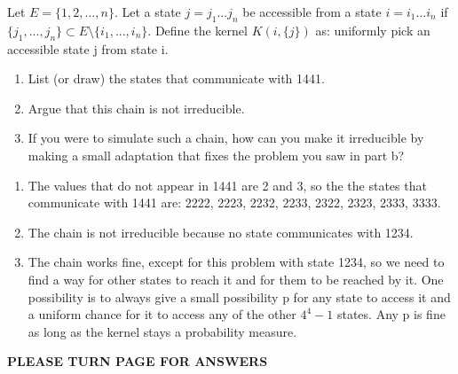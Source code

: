\begin{Exercise}
Let $E = \{1, 2, ..., n\}$. Let a state $j = j_1...j_n$ be accessible from a state $i = i_1...i_n$ if $\{j_1, ..., j_n\} \subset E \setminus \{i_1, ..., i_n\} $. Define the kernel $K(i, \{j\})$ as: uniformly pick an accessible state j from state i. 
\begin{enumerate}[label=(\alph*)]
\item List (or draw) the states that communicate with 1441.
\item Argue that this chain is not irreducible.
\item If you were to simulate such a chain, how can you make it irreducible by making a small adaptation that fixes the problem you saw in part b?
\end{enumerate}
\end{Exercise}
\begin{Answer}
\begin{enumerate}[label=(\alph*)]
\item The values that do not appear in 1441 are 2 and 3, so the the states that communicate with 1441 are: 2222, 2223, 2232, 2233, 2322, 2323, 2333, 3333.
\item The chain is not irreducible because no state communicates with 1234.
\item The chain works fine, except for this problem with state 1234, so we need to find a way for other states to reach it and for them to be reached by it. One possibility is to always give a small possibility p for any state to access it and a uniform chance for it to access any of the other $4^4-1$ states. Any p is fine as long as the kernel stays a probability measure.
\end{enumerate}
\end{Answer}

\vspace{8cm}
\centerline{\textbf{\uppercase{PLEASE TURN PAGE FOR ANSWERS}}}



\clearpage
\shipoutAnswer
